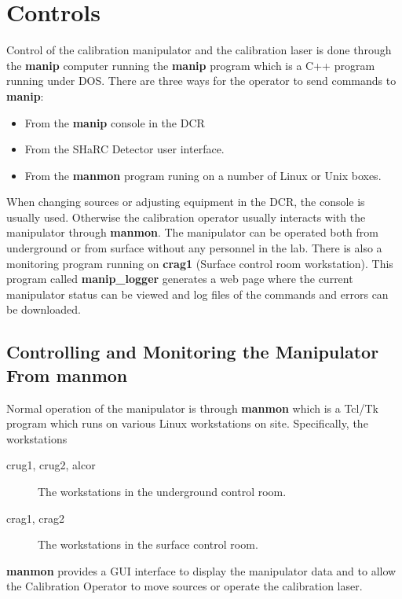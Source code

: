 
  
\chapter{Controls}

  Control of the calibration manipulator and the calibration laser
is done through the {\bf manip} computer running the {\bf manip} program
which is a C++ program running under DOS.  There are three ways for
the operator to send commands to {\bf manip}:
\begin{itemize}
\item From the {\bf manip} console in the DCR
\item From the SHaRC Detector user interface.
\item From the {\bf manmon} program runing on a number of
  Linux or Unix boxes.
\end{itemize}
When changing sources or adjusting equipment in the DCR, the console
is usually used.  Otherwise the calibration operator usually interacts
with the manipulator through {\bf manmon}.  The manipulator can be 
operated both from underground or from surface without any personnel in
the lab.  There is also a 
monitoring program running on {\bf crag1} (Surface control room workstation).
This program called {\bf manip\_logger} generates a web page where
the current manipulator status can be viewed and log files of the commands
and errors can be downloaded.  


\section{Controlling and Monitoring the Manipulator From manmon}

  Normal operation of the manipulator is through {\bf manmon} which
is a Tcl/Tk program which runs on various Linux workstations on site.
Specifically, the workstations
  \begin{description}
  \item[ crug1, crug2, alcor ] The workstations in the underground control room.
  \item[ crag1, crag2 ] The workstations in the surface control room.
  \end{description}
{\bf manmon} provides a GUI interface to display the manipulator data
and to allow the Calibration Operator to move sources or operate the
calibration laser.


